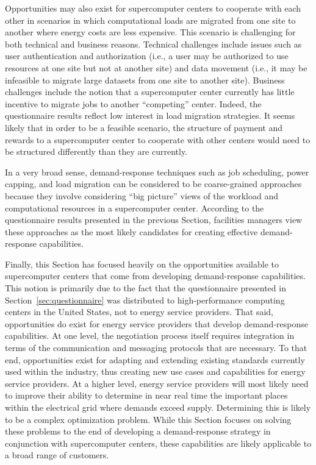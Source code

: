 Opportunities may also exist for supercomputer centers to cooperate
with each other in scenarios in which computational loads are migrated
from one site to another where energy costs are less expensive.  This
scenario is challenging for both technical and business reasons.
Technical challenges include issues such as user authentication and
authorization (i.e., a user may be authorized to use resources at one
site but not at another site) and data movement (i.e., it may be
infeasible to migrate large datasets from one site to another site).
Business challenges include the notion that a supercomputer center
currently has little incentive to migrate jobs to another ``competing''
center.  Indeed, the questionnaire results reflect low interest in
load migration strategies.  It seems likely that in order to be a
feasible scenario, the structure of payment and rewards to a
supercomputer center to cooperate with other centers would need to
be structured differently than they are currently.

In a very broad sense, demand-response techniques such as job scheduling,
power capping, and load migration can be considered to be coarse-grained
approaches because they involve considering ``big picture'' views of the
workload and computational resources in a supercomputer center.  According
to the questionnaire results presented in the previous Section, facilities
managers view these approaches as the most likely candidates for creating
effective demand-response capabilities.

Finally, this Section has focused heavily on the opportunities available
to supercomputer centers that come from developing demand-response
capabilities.  This notion is primarily due to the fact that the
questionnaire presented in Section~\ref{sec:questionnaire} was
distributed to high-performance computing centers in the United
States, not to energy service providers.  That said, opportunities do
exist for energy service providers that develop demand-response
capabilities.  At one level, the negotiation process itself requires
integration in terms of the communication and messaging protocols that
are necessary.  To that end, opportunities exist for adapting and extending
existing standards currently used within the industry, thus creating new
use cases and capabilities for energy service providers.  At a higher
level, energy service providers will most likely need to improve their
ability to determine in near real time the important places within the
electrical grid where demands exceed supply.  Determining this is likely
to be a complex optimization problem.  While this Section focuses on
solving these problems to the end of developing a demand-response
strategy in conjunction with supercomputer centers, these capabilities
are likely applicable to a broad range of customers.
